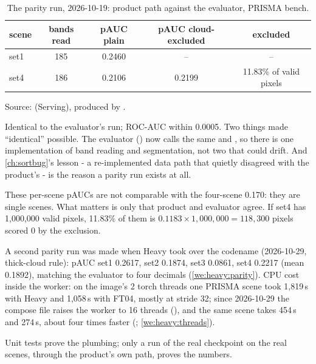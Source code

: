 \begin{table}[htbp]
\centering
\caption{The parity run, 2026-10-19: product path against the evaluator, PRISMA bench.}
\label{tab:shipping:parity}
\small
\begin{tabular}{lcccc}
\toprule
scene & bands read & pAUC plain & pAUC cloud-excluded & excluded \\
\midrule
set1 & 185 & 0.2460 & -- & -- \\
set4 & 186 & 0.2106 & 0.2199 & 11.83\% of valid pixels \\
\bottomrule
\end{tabular}

\smallskip
{\footnotesize Source:  (Serving), produced by
.}
\end{table}

Identical to the evaluator's run; ROC-AUC within 0.0005. Two things made ``identical'' possible. The evaluator
() now calls the same  and , so there is one
implementation of band reading and segmentation, not two that could drift. And \cref{ch:sortbug}'s lesson - a
re-implemented data path that quietly disagreed with the product's - is the reason a parity run exists at all.

These per-scene pAUCs are not comparable with the four-scene 0.170: they are single scenes. What matters is only that
product and evaluator agree. If set4 has 1,000,000 valid pixels, 11.83\% of them is $0.1183 \times 1{,}000{,}000 =
118{,}300$ pixels scored 0 by the exclusion.

\begin{drift}
A second parity run was made when Heavy took over the codename (2026-10-29, thick-cloud rule): pAUC set1 0.2617, set2
0.1874, set3 0.0861, set4 0.2217 (mean 0.1892), matching the evaluator to four decimals (\cref{we:heavy:parity}). CPU
cost inside the worker: on the image's 2 torch threads one PRISMA scene took 1,819\,s with Heavy and 1,058\,s with
FT04, mostly  at stride 32; since 2026-10-29 the compose file raises the worker to 16 threads
(), and the same scene takes 454\,s and 274\,s, about four times faster
(; \cref{we:heavy:threads}).
\end{drift}

\begin{keypoint}
Unit tests prove the plumbing; only a run of the real checkpoint on the real scenes, through the product's own path,
proves the numbers.
\end{keypoint}

